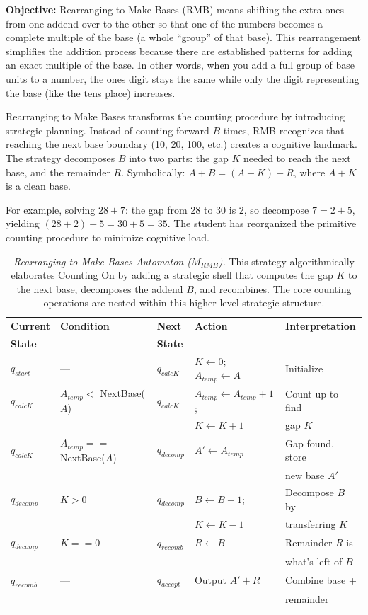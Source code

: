 \documentclass[12pt]{book}
\begin{document}
 \textbf{Objective:} Rearranging to Make Bases (RMB) means shifting the extra ones from one addend over to the other so that one of the numbers becomes a complete multiple of the base (a whole ``group'' of that base). This rearrangement simplifies the addition process because there are established patterns for adding an exact multiple of the base. In other words, when you add a full group of base units to a number, the ones digit stays the same while only the digit representing the base (like the tens place) increases.
   


Rearranging to Make Bases transforms the counting procedure by introducing strategic planning. Instead of counting forward $B$ times, RMB recognizes that reaching the next base boundary (10, 20, 100, etc.) creates a cognitive landmark. The strategy decomposes $B$ into two parts: the gap $K$ needed to reach the next base, and the remainder $R$. Symbolically: $A + B = (A + K) + R$, where $A + K$ is a clean base.

For example, solving $28 + 7$: the gap from 28 to 30 is 2, so decompose $7 = 2 + 5$, yielding $(28+2)+5 = 30+5 = 35$. The student has reorganized the primitive counting procedure to minimize cognitive load.

\begin{table}[H]
\centering
\caption{\textit{Rearranging to Make Bases Automaton ($M_{RMB}$).} This strategy algorithmically elaborates Counting On by adding a strategic shell that computes the gap $K$ to the next base, decomposes the addend $B$, and recombines. The core counting operations are nested within this higher-level strategic structure.}
\label{tab:rmb-automaton}
\begin{tabular}{@{}lllll@{}}
\toprule
\textbf{Current} & \textbf{Condition} & \textbf{Next} & \textbf{Action} & \textbf{Interpretation} \\
\textbf{State} & & \textbf{State} & & \\
\midrule
$q_{start}$ & --- & $q_{calcK}$ & $K \leftarrow 0$; $A_{temp} \leftarrow A$ & Initialize \\
$q_{calcK}$ & $A_{temp} < $ NextBase($A$) & $q_{calcK}$ & $A_{temp} \leftarrow A_{temp} + 1$; & Count up to find \\
 & & & $K \leftarrow K + 1$ & gap $K$ \\
$q_{calcK}$ & $A_{temp} == $ NextBase($A$) & $q_{decomp}$ & $A' \leftarrow A_{temp}$ & Gap found, store \\
 & & & & new base $A'$ \\
$q_{decomp}$ & $K > 0$ & $q_{decomp}$ & $B \leftarrow B - 1$; & Decompose $B$ by \\
 & & & $K \leftarrow K - 1$ & transferring $K$ \\
$q_{decomp}$ & $K == 0$ & $q_{recomb}$ & $R \leftarrow B$ & Remainder $R$ is \\
 & & & & what's left of $B$ \\
$q_{recomb}$ & --- & $q_{accept}$ & Output $A' + R$ & Combine base + \\
 & & & & remainder \\
\bottomrule
\end{tabular}
\end{table}
\end{document}
